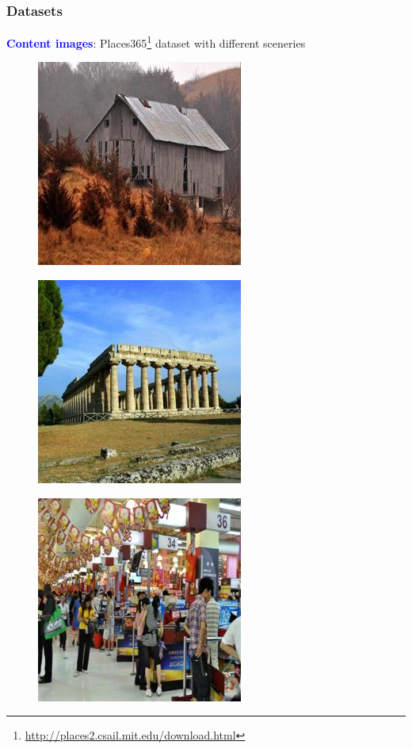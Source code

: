 \documentclass[11pt,xcolor=dvipsnames]{beamer}
\begin{document}
\begin{frame}
\frametitle{Datasets}

\textcolor{blue}{\textbf{Content images}}: Places365\footnote{\url{http://places2.csail.mit.edu/download.html}} dataset with different sceneries

\begin{multicols*}{3}

\begin{figure}
	\includegraphics[width=0.5\linewidth]{places0.jpg}
\end{figure}

\columnbreak

\begin{figure}
	\includegraphics[width=0.5 \linewidth]{places1.jpg}
\end{figure}

\columnbreak

\begin{figure}
	\includegraphics[width=0.5\linewidth]{places2.jpg}
\end{figure}


\end{multicols*}
\end{frame}
\end{document}
